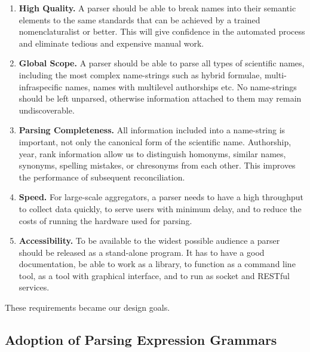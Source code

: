 \documentclass{bmcart}
\begin{document}
\begin{enumerate}

  \item \textbf{High Quality.} A parser should be able to break names into their
    semantic elements to the same standards that can be achieved by a trained
    nomenclaturalist or better. This will give confidence in the automated process and eliminate tedious
    and expensive manual work.

  \item \textbf{Global Scope.} A parser should be able to parse all types of
    scientific names, including the most complex name-strings such as hybrid
    formulae, multi-infraspecific names, names with multilevel authorships etc.
    No name-strings should be left unparsed, otherwise information attached to
    them may remain undiscoverable.

  \item \textbf{Parsing Completeness.} All information included into a
    name-string is important, not only the canonical form of the scientific name. Authorship, year,
    rank information allow us to distinguish homonyms, similar names, synonyms,
    spelling mistakes, or chresonyms from each other.  This improves the performance of subsequent reconciliation.

  \item \textbf{Speed.} For large-scale aggregators, a parser needs to have a
    high throughput to collect data quickly, to serve users with minimum delay,
    and to reduce the costs of running the hardware used for parsing.

  \item \textbf{Accessibility.} To be available to the widest possible audience
    a parser should be released as a stand-alone program. It has to have a
    good documentation, be able to work as a library, to function as a command
    line tool, as a tool with graphical interface, and to run as socket and
    RESTful services.

\end{enumerate}

These requirements became our design goals. 

\subsection*{Adoption of Parsing Expression Grammars}
\end{document}
